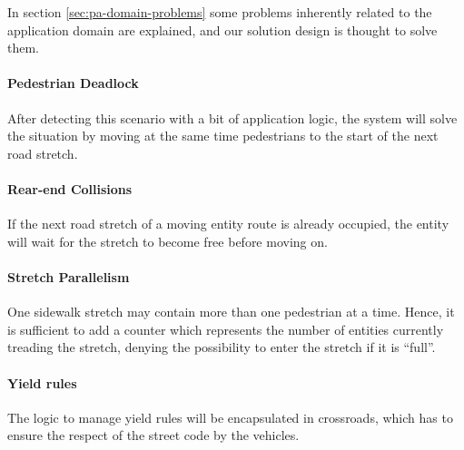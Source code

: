 In section \ref{sec:pa-domain-problems} some problems 
inherently related to the application domain are explained, 
and our solution design is thought to solve them.

\paragraph{Pedestrian Deadlock} 
After detecting this scenario with a bit of application logic, 
the system will solve the situation by moving at the same
time pedestrians to the start of the next road stretch.

\paragraph{Rear-end Collisions} 
If the next road stretch of a moving entity route is already occupied,
the entity will wait for the stretch to become free 
before moving on.

\paragraph{Stretch Parallelism} One sidewalk stretch may contain more than one pedestrian at a time.
Hence, it is sufficient to add a counter which represents
the number of entities currently treading the stretch, 
denying the possibility to enter the stretch if it is ``full''.

\paragraph{Yield rules} The logic to manage yield rules will be encapsulated in
crossroads, which has to ensure the respect of the street code by the vehicles.
